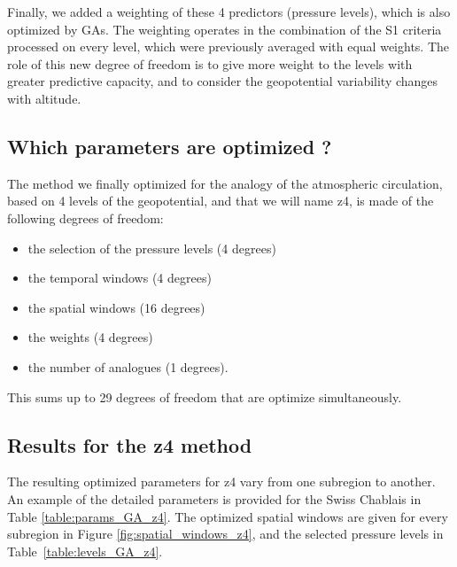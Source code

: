\documentclass[5p]{elsarticle}
\begin{document}
Finally, we added a weighting of these 4 predictors (pressure levels), which is also optimized by GAs. The weighting operates in the combination of the S1 criteria processed on every level, which were previously averaged with equal weights. The role of this new degree of freedom is to give more weight to the levels with greater predictive capacity, and to consider the geopotential variability changes with altitude. 


\subsection{Which parameters are optimized ?}

The method we finally optimized for the analogy of the atmospheric circulation, based on 4 levels of the geopotential, and that we will name z4, is made of the following degrees of freedom:

\begin{itemize}
	\setlength\itemsep{-4px}
	\item the selection of the pressure levels (4 degrees)
	\item the temporal windows (4 degrees)
	\item the spatial windows (16 degrees)
	\item the weights (4 degrees)
	\item the number of analogues (1 degrees).
\end{itemize}

This sums up to 29 degrees of freedom that are optimize simultaneously.


\subsection{Results for the z4 method}

The resulting optimized parameters for z4 vary from one subregion to another. An example of the detailed parameters is provided for the Swiss Chablais in Table \ref{table:params_GA_z4}. The optimized spatial windows are given for every subregion in Figure \ref{fig:spatial_windows_z4}, and the selected pressure levels in Table~\ref{table:levels_GA_z4}. 
\end{document}
